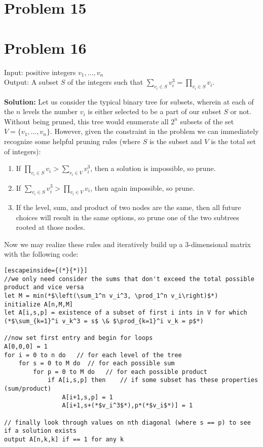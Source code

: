 \documentclass{article}
\providecommand{\prob}[1]{\section*{Problem #1}}
\providecommand{\soln}{\textbf{Solution: }}
\begin{document}
\prob{15}








\prob{16}
Input: positive integers $v_1, \dots , v_n$\\
Output: A subset $S$ of the integers such that $\sum_{v_i \in S}v_i^3 = \prod_{v_i \in S}v_i$.\par \medskip
\soln
Let us consider the typical binary tree for subsets, wherein at each of the $n$ levels the number $v_i$ is either selected to be a part of our subset $S$ or not. Without being pruned, this tree would enumerate all $2^n$ subsets of the set $V = \{v_1,\dots,v_n\}$. However, given the constraint in the problem we can immediately recognize some helpful pruning rules (where $S$ is the subset and $V$ is the total set of integers):\par
\begin{enumerate}
    \item If $\prod_{v_i \in S}v_i > \sum_{v_i \in V}v_i^3$, then a solution is impossible, so prune.
    \item If $\sum_{v_i \in S}v_i^3 > \prod_{v_i \in V}v_i$, then again impossible, so prune.
    \item If the level, sum, and product of two nodes are the same, then all future choices will result in the same options, so prune one of the two subtrees rooted at those nodes.
\end{enumerate}
Now we may realize these rules and iteratively build up a 3-dimensional matrix with the following code:\par
\begin{lstlisting}[escapeinside={(*}{*)}]
//we only need consider the sums that don't exceed the total possible product and vice versa
let M = min(*$\left(\sum_1^n v_i^3, \prod_1^n v_i\right)$*)
initialize A[n,M,M]
let A[i,s,p] = existence of a subset of first i ints in V for which (*$\sum_{k=1}^i v_k^3 = s$ \& $\prod_{k=1}^i v_k = p$*)

//now set first entry and begin for loops
A[0,0,0] = 1
for i = 0 to n do   // for each level of the tree
    for s = 0 to M do  // for each possible sum
        for p = 0 to M do   // for each possible product
            if A[i,s,p] then    // if some subset has these properties (sum/product)
                A[i+1,s,p] = 1
                A[i+1,s+(*$v_i^3$*),p*(*$v_i$*)] = 1

// finally look through values on nth diagonal (where s == p) to see if a solution exists
output A[n,k,k] if == 1 for any k
\end{lstlisting}
\end{document}
